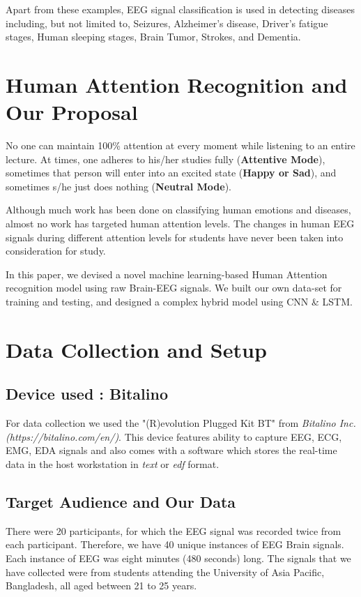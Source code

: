 \documentclass[conference]{IEEEtran}
\begin{document}
Apart from these examples, EEG signal classification is used in detecting diseases including, but not limited to, Seizures, Alzheimer’s disease, Driver’s fatigue stages, Human sleeping stages, Brain Tumor, Strokes, and Dementia.

\section{Human Attention Recognition and Our Proposal}\label{hal}
No one can maintain 100\% attention at every moment while listening to an entire lecture.  At times, one adheres to his/her studies fully (\textbf{Attentive Mode}), sometimes that person will enter into an excited state (\textbf{Happy or Sad}), and sometimes s/he just does nothing (\textbf{Neutral Mode}).  

Although much work has been done on classifying human emotions and diseases, almost no work has targeted human attention levels. The changes
in human EEG signals during different attention levels for students have never been taken into consideration for study.  

In this paper, we devised a novel machine learning-based Human Attention recognition model using raw Brain-EEG signals. We built our own data-set for training and testing, and designed a complex hybrid
model using CNN \& LSTM.

\section{Data Collection and Setup}
\label{AA}

\subsection{Device used : Bitalino}
For data collection we used the "(R)evolution Plugged Kit BT" from \textit{Bitalino Inc.(\textit{https://bitalino.com/en/})}. This device features ability to capture EEG, ECG, EMG, EDA signals and also comes with a software which stores the real-time data in the host workstation in \textit{text} or \textit{edf} format.

\subsection{Target Audience and Our Data}
There were 20 participants, for which the EEG signal was recorded twice from each participant. Therefore, we have 40 unique instances of EEG Brain signals. Each instance of EEG was eight minutes (480 seconds) long. The signals that we have collected were from students attending the University of Asia Pacific, Bangladesh, all aged between 21 to 25 years.
  
\end{document}

